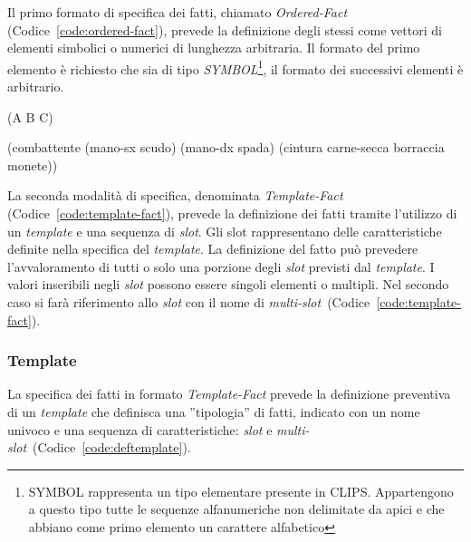 Il primo formato di specifica dei fatti, chiamato \emph{Ordered-Fact} (Codice~\ref{code:ordered-fact}), prevede la definizione degli stessi come vettori di elementi simbolici o numerici di lunghezza arbitraria. Il formato del primo elemento è richiesto che sia di tipo \emph{SYMBOL}\footnote{SYMBOL rappresenta un tipo elementare presente in CLIPS. Appartengono a questo tipo tutte le sequenze alfanumeriche non delimitate da apici e che abbiano come primo elemento un carattere alfabetico}, il formato dei successivi elementi è arbitrario.

\begin{program}
\begin{verbatimtab}

(A B C)
\end{verbatimtab}
\caption{Fatto definito utilizzando la notazione \emph{Ordered-Fact}}\label{code:ordered-fact}
\end{program}


\begin{program}
\begin{verbatimtab}

(combattente
	(mano-sx scudo)
	(mano-dx spada)
	(cintura carne-secca borraccia monete))
\end{verbatimtab}
\caption[Fatto definito utilizzando la notazione \emph{Template-Fact}]{Fatto definito utilizzando la notazione \emph{Template-Fact}. Il nome del template a cui il fatto fa riferimento è \emph{combattente}. La specifica del \emph{template} prevede l'esistenza degli slot ''mano-sx'', ''mano-dx'' e ''cintura''}\label{code:template-fact}
\end{program}

La seconda modalità di specifica, denominata \emph{Template-Fact} (Codice~\ref{code:template-fact}), prevede la definizione dei fatti tramite l'utilizzo di un \emph{template} e una sequenza di \emph{slot}. Gli slot rappresentano delle caratteristiche definite nella specifica del \emph{template}.
La definizione del fatto può prevedere l'avvaloramento di tutti o solo una porzione degli \emph{slot} previsti dal \emph{template}.
I valori inseribili negli \emph{slot} possono essere singoli elementi o multipli. Nel secondo caso si farà riferimento allo \emph{slot} con il nome di \emph{multi-slot}~(Codice~\ref{code:template-fact}).

\subsubsection{Template}\label{par:linguaggio-template}
La specifica dei fatti in formato \emph{Template-Fact} prevede la definizione preventiva di un \emph{template} che definisca una ''tipologia'' di fatti, indicato con un nome univoco e una sequenza di caratteristiche: \emph{slot} e \emph{multi-slot}~(Codice~\ref{code:deftemplate}).

